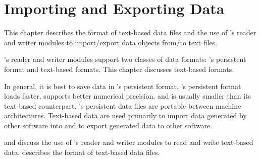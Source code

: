 %
% 
% 
% 
%  
% 
% 
%


\chapter{Importing and Exporting \sr{} Data}
\label{ch:import_export} 

This chapter describes the format of text-based data files and the use
of \sr{}'s reader and writer modules to import/export \sr{} data
objects from/to text files. 

\sr{}'s reader and writer modules support two classes of data formats:
\sr{}'s persistent format and text-based formats.  This chapter
discusses text-based formats.

In general, it is best to save data in \sr{}'s persistent
format.  \sr{}'s persistent format loads faster, supports better
numerical precision, and is usually smaller than its text-based
counterpart.  \sr{}'s persistent data files are portable between machine
architectures.  Text-based data are used primarily to import data
generated by other software into \sr{} and to export \sr{} generated
data to other software.

 and  discuss the use of \sr{}'s reader and
writer modules to read and write text-based data.
 describes
the format of text-based data files.


